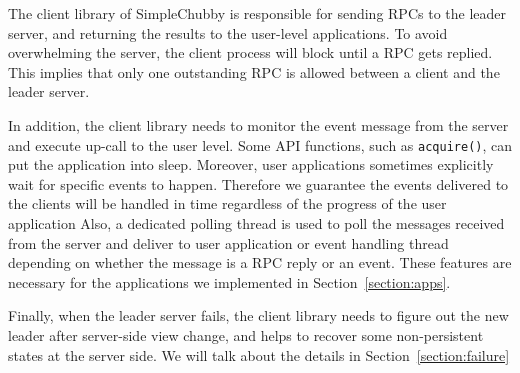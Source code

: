 The client library of SimpleChubby is responsible for sending RPCs to the
leader server, and returning the results to the user-level applications.
To avoid overwhelming the server, the client process will block until a RPC
gets replied. This implies that only one
outstanding RPC is allowed between a client and the leader server.

In addition, the client library needs to
monitor the event message from the server and execute up-call
to the user level. Some API functions, such as \texttt{acquire()}, can put
the application into sleep. Moreover, user applications sometimes explicitly
wait for specific events to happen. Therefore we guarantee the events delivered to the
clients will be handled in time regardless of the progress of the user application
Also, a dedicated polling
thread is used to poll the messages received from the server and deliver to
user application or event handling thread depending on whether the message
is a RPC reply or an event. These features are necessary
for the applications we implemented in Section~\ref{section:apps}.

Finally, when the leader server fails, the client library needs to figure out
the new leader after server-side view change, and helps to recover some
non-persistent states at the server side. We will talk about the details in
Section~\ref{section:failure}




